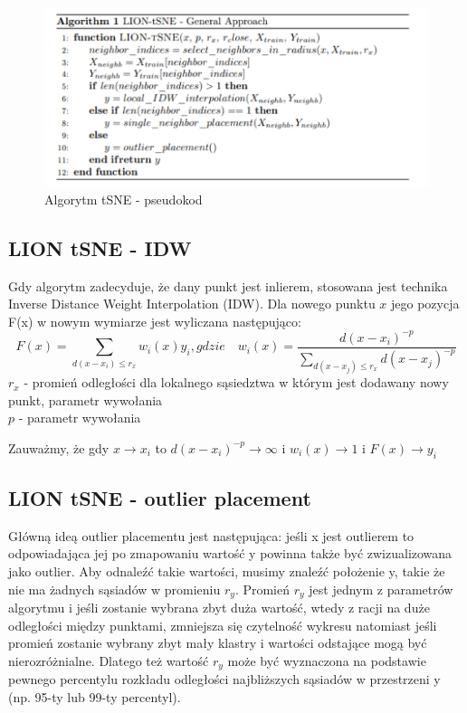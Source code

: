 \documentclass{article}
\begin{document}
\begin{figure}[h]
\includegraphics[scale=0.52]{algorithm_lionTSNE_pseudocode.PNG}
\caption{Algorytm tSNE - pseudokod}
\end{figure}

\subsection{LION tSNE - IDW}

Gdy algorytm zadecyduje, że dany punkt jest inlierem, stosowana jest technika Inverse Distance Weight Interpolation (IDW). Dla nowego punktu  $x$ jego pozycja F(x) w nowym wymiarze jest wyliczana następująco:
\[
    F(x) = \sum_{d(x - x_i) \leq r_x} w_i(x) y_i, gdzie \quad w_i(x) = \frac{d(x - x_i)^{-p}}{\sum_{d(x - x_j) \leq r_x} d(x - x_j)^{-p}}
\]
$r_x$ - promień odległości dla lokalnego sąsiedztwa w którym jest dodawany nowy punkt, parametr wywołania \\
$p$ - parametr wywołania

Zauważmy, że gdy $ x \rightarrow x_i$ to $d(x - x_i)^{-p} \rightarrow \infty $ i $w_i(x) \rightarrow 1$ i $F(x) \rightarrow y_i$

\subsection{LION tSNE - outlier placement}

Główną ideą outlier placementu jest następująca: jeśli x jest outlierem to 
odpowiadająca jej po zmapowaniu wartość y powinna także być zwizualizowana 
jako outlier. Aby odnaleźć takie wartości, musimy znaleźć położenie y, takie 
że nie ma żadnych sąsiadów w promieniu $r_y$. 
Promień $r_y$ jest jednym z parametrów algorytmu i jeśli zostanie wybrana
zbyt duża wartość, wtedy z racji na duże odległości między punktami, zmniejsza 
się czytelność wykresu natomiast jeśli promień zostanie wybrany zbyt mały klastry 
i wartości odstające mogą być nierozróżnialne. Dlatego też wartość $r_y$ może 
być wyznaczona na podstawie pewnego percentylu rozkładu odległości najbliższych 
sąsiadów w przestrzeni y (np. 95-ty lub 99-ty percentyl).
\end{document}
